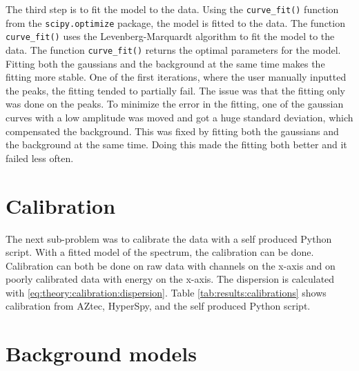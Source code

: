 The third step is to fit the model to the data.
Using the \verb|curve_fit()| function from the \verb|scipy.optimize| package, the model is fitted to the data.
The function \verb|curve_fit()| uses the Levenberg-Marquardt algorithm to fit the model to the data.
The function \verb|curve_fit()| returns the optimal parameters for the model.
Fitting both the gaussians and the background at the same time makes the fitting more stable.
One of the first iterations, where the user manually inputted the peaks, the fitting tended to partially fail.
The issue was that the fitting only was done on the peaks.
To minimize the error in the fitting, one of the gaussian curves with a low amplitude was moved and got a huge standard deviation, which compensated the background.
This was fixed by fitting both the gaussians and the background at the same time.
Doing this made the fitting both better and it failed less often.

%
%
\section{Calibration}
\label{sec:results:calibration}

The next sub-problem was to calibrate the data with a self produced Python script.
With a fitted model of the spectrum, the calibration can be done.
Calibration can both be done on raw data with channels on the x-axis and on poorly calibrated data with energy on the x-axis.
The dispersion is calculated with \cref{eq:theory:calibration:dispersion}.
Table \cref{tab:results:calibrations} shows calibration from AZtec, HyperSpy, and the self produced Python script.



%
%
\section{Background models}
\label{sec:results:background}

